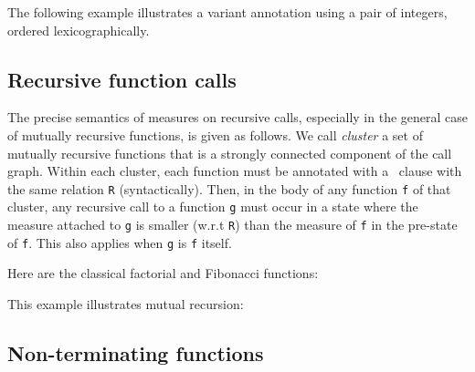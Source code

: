 \begin{example}
  The following example illustrates a variant annotation
  using a pair of integers, ordered lexicographically.
\end{example}

\subsection{Recursive function calls}

The precise semantics of measures on recursive calls, especially in
the general case of mutually recursive functions, is given as follows.
We call \emph{cluster} a set of mutually recursive functions that
is a strongly connected component of the call graph.
Within each cluster, each function must be annotated with a \decreases\
clause with the same relation \lstinline|R| (syntactically). Then, in the body
of any function \lstinline|f| of that cluster, any recursive call to a function
\lstinline|g| must occur in a state where the measure attached to
\lstinline|g| is smaller
(w.r.t \lstinline|R|) than the measure of \lstinline|f| in the pre-state of \lstinline|f|. This also
applies when \lstinline|g| is \lstinline|f| itself.

\begin{example}
  Here are the classical factorial and Fibonacci functions:
\end{example}

\begin{example}
  This example illustrates mutual recursion:
\end{example}




\subsection{Non-terminating functions}
\label{sec:non-term-funct}
\experimental

